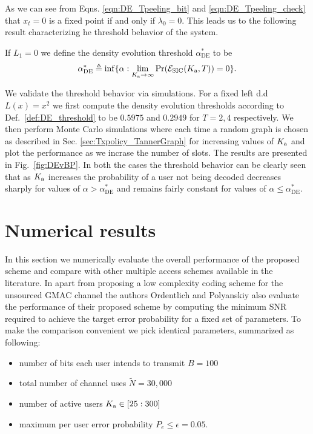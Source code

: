 As we can see from Eqns. \eqref{eqn:DE_Tpeeling_bit} and \eqref{eqn:DE_Tpeeling_check} that $x_t=0$ is a fixed point if and only if $\lambda_0=0$. This leads us to the following result characterizing he threshold behavior of the system.
\begin{definition}
If $L_1=0$ we define the density evolution threshold $\alpha^*_{\text{DE}}$ to be
\[
\alpha^*_{\text{DE}}\triangleq \inf \{\alpha: \lim_{K_{\text{a}}\rightarrow \infty} \mathrm{Pr}(\mathcal{E}_{\text{SIC}}(K_{\text{a}},T))=0\}.
\]
\label{def:DE_threshold}
\end{definition}

We validate the threshold behavior via simulations.  For a fixed left d.d $L(x)=x^2$ we first compute the density evolution thresholds according to Def.~\ref{def:DE_threshold} to be $0.5975$ and $0.2949$ for $T=2,4$ respectively. We then perform Monte Carlo simulations where each time a random graph is chosen as described in Sec. \ref{sec:Txpolicy_TannerGraph} for increasing values of $K_{\text{a}}$ and plot the performance as we incrase the number of slots. The results are presented in Fig.~\ref{fig:DEvBP}. In both the cases the threshold behavior can be clearly seen that as $K_{\text{a}}$ increases the probability of a user not being decoded decreases sharply for values of $\alpha>\alpha_{\text{DE}}^*$ and remains fairly constant for values of $\alpha\leq\alpha_{\text{DE}}^*$.

\section{Numerical results}
In this section we numerically evaluate the overall performance of the proposed scheme and compare with other multiple access schemes available in the literature. In \cite{ordentlich2017low} apart from proposing a low complexity coding scheme for the unsourced GMAC channel the authors Ordentlich and Polyanskiy also evaluate the performance of their proposed scheme by computing the minimum SNR required to achieve the target error probability for a fixed set of parameters. To make the comparison convenient we pick identical parameters, summarized as following:
\begin{itemize}
\item number of bits each user intends to transmit $B=100$
\item total number of channel uses $\tilde{N}=30,000$
\item number of active users $K_{\text{a}}\in [25:300]$
\item maximum per user error probability $P_e\leq \epsilon=0.05$.
\end{itemize}


